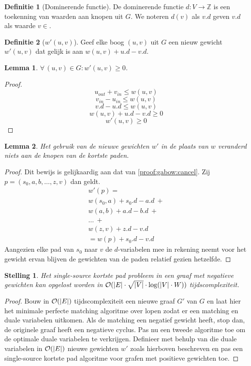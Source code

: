 \documentclass[conference]{IEEEtran}
\newtheorem{theorem}{Stelling}[section]
\newtheorem{lemma}{Lemma}[section]
\theoremstyle{definition}
\newtheorem{definition}{Definitie}[section]
\theoremstyle{remark}
\DeclarePairedDelimiter{\card}{\vert}{\vert}  %
\let \oldforall \forall
\renewcommand{\forall}{\oldforall\,}
\newcommand{\vin}{_{in}}
\newcommand{\vout}{_{out}}
\begin{document}
\begin{definition}[Dominerende functie]
    De dominerende functie $d: V \longrightarrow \mathbb{Z}$ is een toekenning van waarden aan knopen uit $G$. We noteren $d(v)$ als $v.d$ geven $v.d$ als waarde $v\in$.
\end{definition}

\begin{definition}[$w'(u, v)$]
    Geef elke boog $(u, v)$ uit $G$ een nieuw gewicht $w'(u, v)$ dat gelijk is aan $w(u, v) + u.d - v.d$.
\end{definition}

\begin{lemma}
    $\forall (u, v) \in G: w'(u, v) \geq 0$.
\end{lemma}
\begin{proof}
    $$u\vout + v\vin \leq w(u, v)$$
    $$v\vin - u\vin \leq w(u, v)$$
    $$v.d - u.d \leq w(u, v)$$
    $$w(u, v) + u.d - v.d \geq 0$$
    $$w'(u, v) \geq 0$$
\end{proof}

\begin{lemma}
    Het gebruik van de nieuwe gewichten $w'$ in de plaats van $w$ veranderd niets aan de knopen van de kortste paden.
\end{lemma}
\begin{proof}
    Dit bewijs is gelijkaardig aan dat van \ref{proof:gabow:cancel}. Zij $p = (s_0, a, b, \dots, z, v)$ dan geldt.
    \begin{gather*}
        w'(p) =\\
        w(s_0, a) + s_0.d - a.d\ +\\
        w(a, b) + a.d - b.d\ +\\
        \dots\ +\\
        w(z, v) + z.d - v.d\\
        = w(p) + s_0.d - v.d
    \end{gather*}
    Aangezien elke pad van $s_0$ naar $v$ de $d$-variabelen mee in rekening neemt voor het gewicht ervan blijven de gewichten van de paden relatief gezien hetzelfde.
\end{proof}

\begin{theorem}
    Het single-source kortste pad probleem in een graaf met negatieve gewichten kan opgelost worden in $\mathcal{O}(\card{E} \cdot \sqrt{\card{V}} \cdot \log(\card{V} \cdot W))$ tijdscomplexiteit.
\end{theorem}
\begin{proof}
    Bouw in $\mathcal{O}(\card{E})$ tijdscomplexiteit een nieuwe graaf $G'$ van $G$ en laat hier het minimale perfecte matching algoritme over lopen zodat er een matching en duale variabelen uitkomen. Als de matching een negatief gewicht heeft, stop dan, de originele graaf heeft een negatieve cyclus. Pas nu een tweede algoritme toe om de optimale duale variabelen te verkrijgen. Definieer met behulp van die duale variabelen in $\mathcal{O}(\card{E})$ nieuwe gewichten $w'$ zoals hierboven beschreven en pas een single-source kortste pad algoritme voor grafen met positieve gewichten toe.
\end{proof}
\end{document}
